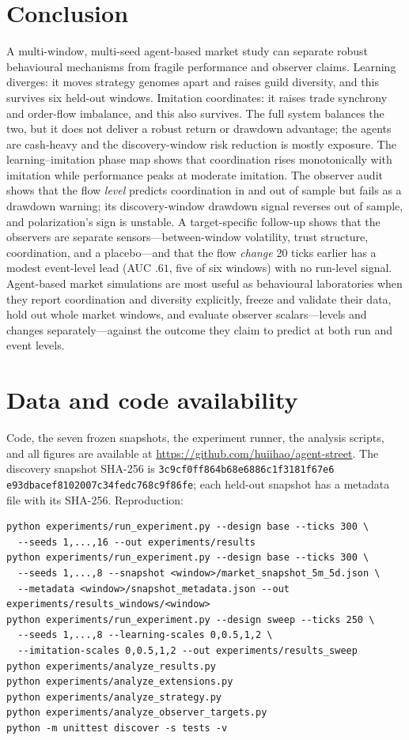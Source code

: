 \documentclass[11pt]{article}
\begin{document}
\section{Conclusion}

A multi-window, multi-seed agent-based market study can separate robust
behavioural mechanisms from fragile performance and observer claims. Learning
diverges: it moves strategy genomes apart and raises guild diversity, and this
survives six held-out windows. Imitation coordinates: it raises trade synchrony
and order-flow imbalance, and this also survives. The full system balances the
two, but it does not deliver a robust return or drawdown advantage; the agents
are cash-heavy and the discovery-window risk reduction is mostly exposure. The
learning--imitation phase map shows that coordination rises monotonically with
imitation while performance peaks at moderate imitation. The observer audit shows
that the flow \emph{level} predicts coordination in and out of sample but fails
as a drawdown warning; its discovery-window drawdown signal reverses out of
sample, and polarization's sign is unstable. A target-specific follow-up shows
that the observers are separate sensors---between-window volatility, trust
structure, coordination, and a placebo---and that the flow \emph{change} 20 ticks
earlier has a modest event-level lead (AUC $.61$, five of six windows) with no
run-level signal. Agent-based market simulations are most useful as behavioural
laboratories when they report coordination and diversity explicitly, freeze and
validate their data, hold out whole market windows, and evaluate observer
scalars---levels and changes separately---against the outcome they claim to
predict at both run and event levels.

\section*{Data and code availability}

Code, the seven frozen snapshots, the experiment runner, the analysis scripts,
and all figures are available at
\url{https://github.com/huiihao/agent-street}. The discovery snapshot SHA-256 is
\texttt{3c9cf0ff864b68e6886c1f3181f67e6}\allowbreak
\texttt{e93dbacef8102007c34fedc768c9f86fe}; each held-out snapshot has a
metadata file with its SHA-256. Reproduction:
\begin{verbatim}
python experiments/run_experiment.py --design base --ticks 300 \
  --seeds 1,...,16 --out experiments/results
python experiments/run_experiment.py --design base --ticks 300 \
  --seeds 1,...,8 --snapshot <window>/market_snapshot_5m_5d.json \
  --metadata <window>/snapshot_metadata.json --out experiments/results_windows/<window>
python experiments/run_experiment.py --design sweep --ticks 250 \
  --seeds 1,...,8 --learning-scales 0,0.5,1,2 \
  --imitation-scales 0,0.5,1,2 --out experiments/results_sweep
python experiments/analyze_results.py
python experiments/analyze_extensions.py
python experiments/analyze_strategy.py
python experiments/analyze_observer_targets.py
python -m unittest discover -s tests -v
\end{verbatim}



\end{document}

